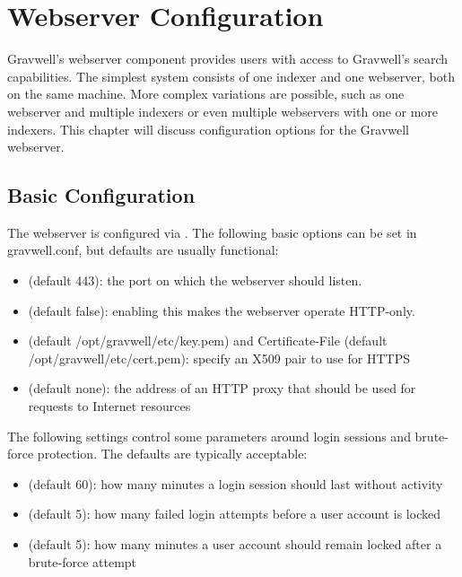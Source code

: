 \chapter{Webserver Configuration}
Gravwell's webserver component provides users with access to Gravwell's
search capabilities. The simplest system consists of one indexer and one
webserver, both on the same machine. More complex variations are
possible, such as one webserver and multiple indexers or even multiple
webservers with one or more indexers. This chapter will discuss
configuration options for the Gravwell webserver.

\section{Basic Configuration}
The webserver is configured via . The following basic options can be set
in gravwell.conf, but defaults are usually functional:

\begin{itemize}
\item
   (default 443): the port on which the webserver should listen.
\item
   (default false): enabling this makes the webserver operate HTTP-only.
\item
   (default /opt/gravwell/etc/key.pem) and Certificate-File
  (default /opt/gravwell/etc/cert.pem): specify an X509 pair to use for
  HTTPS
\item
   (default none): the address of an HTTP proxy that should
  be used for requests to Internet resources
\end{itemize}

The following settings control some parameters around login sessions
and brute-force protection. The defaults are typically acceptable:

\begin{itemize}
\item
   (default 60): how many minutes a login
  session should last without activity
\item
   (default 5): how many failed login attempts
  before a user account is locked
\item
   (default 5): how many minutes a user
  account should remain locked after a brute-force attempt
\end{itemize}


